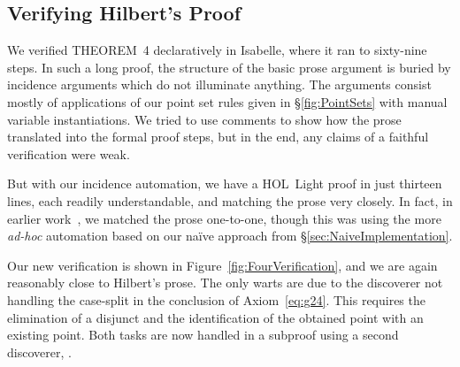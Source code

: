 \subsection{Verifying Hilbert's Proof}
We verified THEOREM~4 declaratively in Isabelle, where it ran to sixty-nine steps. In such a long proof, the structure of the basic prose argument is buried by incidence arguments which do not illuminate anything. The arguments consist mostly of applications of our point set rules given in \S\ref{fig:PointSets} with manual variable instantiations. We tried to use comments to show how the prose translated into the formal proof steps, but in the end, any claims of a faithful verification were weak.

But with our incidence automation, we have a HOL~Light proof in just thirteen lines, each readily understandable, and matching the prose very closely. In fact, in earlier work~\cite{ScottExploring}, we matched the prose one-to-one, though this was using the more \emph{ad-hoc} automation based on our na\"{i}ve approach from \S\ref{sec:NaiveImplementation}.

Our new verification is shown in Figure~\ref{fig:FourVerification}, and we are again reasonably close to Hilbert's prose. The only warts are due to the  discoverer not handling the case-split in the conclusion of Axiom~\ref{eq:g24}. This requires the elimination of a disjunct and the identification of the obtained point with an existing point. Both tasks are now handled in a subproof using a second discoverer, . 


